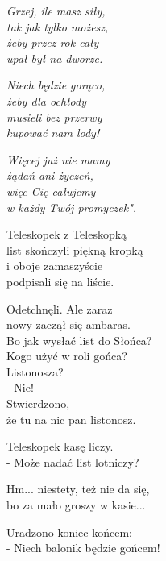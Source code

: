 \documentclass[11pt,a4pape,leqno,twoside]{book}
\begin{document}
\textit{Grzej, ile masz siły,}\\
\textit{tak jak tylko możesz,}\\
\textit{żeby przez rok cały}\\
\textit{upał był na dworze.}\\ \vspace{0.1cm}

\textit{Niech będzie gorąco,}\\
\textit{żeby dla ochłody}\\
\textit{musieli bez przerwy}\\
\textit{kupować nam lody!}\\ \vspace{0.1cm}

\textit{Więcej już nie mamy}\\
\textit{żądań ani życzeń,}\\
\textit{więc Cię całujemy}\\
\textit{w każdy Twój promyczek".}\\ \vspace{0.4cm}

Teleskopek z Teleskopką\\
list skończyli piękną kropką\\
i oboje zamaszyście\\
podpisali się na liście.\\ \vspace{0.1cm}

Odetchnęli. Ale zaraz\\
nowy zaczął się ambaras.\\
Bo jak wysłać list do Słońca?\\
Kogo użyć w roli gońca?\\
Listonosza?\\
- Nie!\\
Stwierdzono,\\
że tu na nic pan listonosz.\\ \vspace{0.1cm}

Teleskopek kasę liczy.\\
- Może nadać list lotniczy?\\ \vspace{0.1cm}

Hm... niestety, też nie da się,\\
bo za mało groszy w kasie...\\ \vspace{0.1 cm}

Uradzono koniec końcem:\\
- Niech balonik będzie gońcem!\\ \vspace{0.1cm}
\end{document}
